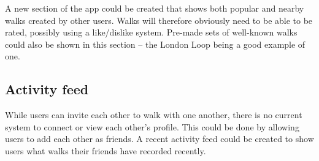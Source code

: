 A new section of the app could be created that shows both popular and nearby walks created by other users. Walks will therefore obviously need to be able to be rated, possibly using a like/dislike system. Pre-made sets of well-known walks could also be shown in this section -- the London Loop being a good example of one.

\subsection{Activity feed}

While users can invite each other to walk with one another, there is no current system to connect or view each other's profile. This could be done by allowing users to add each other as friends. A recent activity feed could be created to show users what walks their friends have recorded recently.



